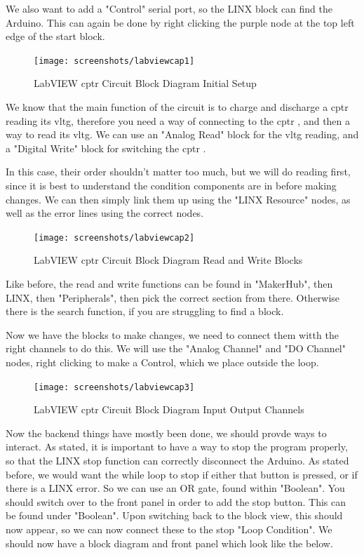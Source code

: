 \documentclass[a4paper,11pt]{report}
\begin{document}
We also want to add a "Control" serial port, so the LINX block can find the Arduino. This can again be done by right clicking the purple node at the top left edge of the start block.

\begin{figure}[H]
\centering
\texttt{[image: screenshots/labviewcap1]}
\caption{LabVIEW \gls{cptr} Circuit Block Diagram Initial Setup}
\end{figure}

We know that the main function of the circuit is to charge and discharge a \gls{cptr} reading its \gls{vltg}, therefore you need a way of connecting to the \gls{cptr} , and then a way to read its \gls{vltg}. We can use an "Analog Read" block for the \gls{vltg} reading, and a "Digital Write" block for switching the \gls{cptr} .

In this case, their order shouldn't matter too much, but we will do reading first, since it is best to understand the condition components are in before making changes. We can then simply link them up using the "LINX Resource" nodes, as well as the error lines using the correct nodes.

\begin{figure}[H]
\centering
\texttt{[image: screenshots/labviewcap2]}
\caption{LabVIEW \gls{cptr} Circuit Block Diagram Read and Write Blocks}
\end{figure}

Like before, the read and write functions can be found in "MakerHub", then LINX, then "Peripherals", then pick the correct section from there. Otherwise there is the search function, if you are struggling to find a block.

Now we have the blocks to make changes, we need to connect them witth the right channels to do this. We will use the "Analog Channel" and "DO Channel" nodes, right clicking to make a Control, which we place outside the loop.

\begin{figure}[H]
\centering
\texttt{[image: screenshots/labviewcap3]}
\caption{LabVIEW \gls{cptr} Circuit Block Diagram Input Output Channels}
\end{figure}

Now the backend things have mostly been done, we should provde ways to interact. As stated, it is important to have a way to stop the program properly, so that the LINX stop function can correctly disconnect the Arduino. As stated before, we would want the while loop to stop if either that button is pressed, or if there is a LINX error. So we can use an OR gate, found within "Boolean". You should switch over to the front panel in order to add the stop button. This can be found under "Boolean". Upon switching back to the block view, this should now appear, so we can now connect these to the stop "Loop Condition". We should now have a block diagram and front panel which look like the below.
\end{document}
